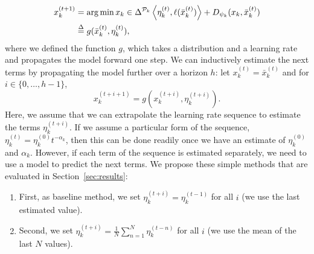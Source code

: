 \documentclass{sig-alternate-ipsn13}
\begin{document}
\begin{equation}
  \label{eq:estimation_step}
  \begin{aligned}
x_k^{(t+1)}
&= \operatorname*{arg\,min}{x_k \in \Delta^{\mathcal{P}_k}} \left\langle \eta_k^{(t)} ,  \ell(\bar x^{(t)}_k)  \right\rangle + D_{\psi_k}(x_k, \bar x^{(t)}_k) \\
&\overset{\Delta}{=} g(\bar x^{(t)}_k, \eta_k^{(t)}),
\end{aligned}
\end{equation}
where we defined the function $g$, which takes a distribution and a learning rate and propagates the model forward one step. We can inductively estimate the next terms by propagating the model further over a horizon $h$: let $x_k^{(t)} = \bar x_k^{(t)}$ and for $i \in \{0, \dots, h-1\}$,
\begin{equation}
\label{eq:propagation}
x_k^{(t+i+1)} = g(x^{(t+i)}_k, \eta_k^{(t+i)}).
\end{equation}
Here, we assume that we can extrapolate the learning rate sequence to estimate the terms $\eta_k^{(t+i)}$. If we assume a particular form of the sequence, $\eta_k^{(t)} = \eta_k^{(0)} t^{-\alpha_k}$, then this can be done readily once we have an estimate of $\eta_k^{(0)}$ and $\alpha_k$. However, if each term of the sequence is estimated separately, we need to use a model to predict the next terms. We propose these simple methods that are evaluated in Section~\ref{sec:results}:
\begin{enumerate}
\item First, as baseline method, we set $\eta_k^{(t+i)} = \eta^{(t-1)}_k$ for all $i$ (we use the last estimated value).
\item Second, we set $\eta_k^{(t+i)} = \frac{1}{N} \sum_{n = 1}^N \eta^{(t-n)}_k$ for all $i$ (we use the mean of the last $N$ values).
\end{enumerate}
\end{document}
